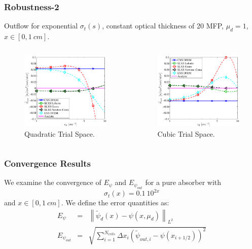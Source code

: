 \documentclass{beamer}
\newcommand{\be}{\begin{equation*}}   %
\newcommand{\ee}{\end{equation*}}
\newcommand{\bea}{\begin{eqnarray*}}  %
\newcommand{\eea}{\end{eqnarray*}}
\newcommand{\norm}[1]{\ensuremath{\left\lVert #1 \right\rVert}}  %
\begin{document}
\begin{frame}
\frametitle{Robustness-2}
Outflow for exponential $\sigma_t(s)$, constant optical thickness of 20 MFP, $\mu_d = 1$, $x\in[0,1~cm]$.
\begin{columns}[c]
\begin{figure}
\includegraphics[width=5cm]{Exp_outflow_p2.eps}
\caption{Quadratic Trial Space.}
\end{figure}
\begin{figure}
\includegraphics[width=5cm]{Exp_outflow_p3.eps}
\caption{Cubic Trial Space.}
\end{figure}
\end{columns}
\end{frame}

\begin{frame}
\frametitle{Convergence Results}
We examine the convergence of $E_{\psi}$ and $E_{\psi_{out}}$ for a pure absorber with
\be
\sigma_t(x) = 0.1~10^{2x}
\ee
and $x\in[0,1~cm]$.  We define the error quantities as:
\bea
E_{\psi} &=& \norm{ \widetilde{\psi}_d(x) - \psi(x,\mu_d)  }_{L^2} \\
E_{\psi_{out}} &=& \sqrt{\sum_{i=1}^{N_{cells}}{\Delta x_i\left(\widetilde{\psi}_{out,i} - \psi(x_{i+1/2})  \right)^2   }}  
\eea
\end{frame}
\end{document}
